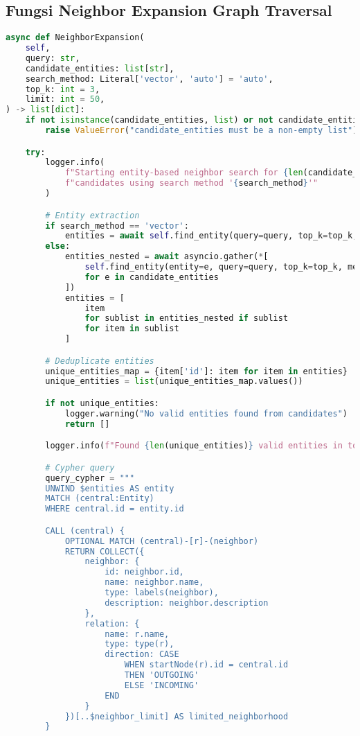 \subsection{Fungsi Neighbor Expansion Graph Traversal}
\begin{lstlisting}[numbers=none, language=python]
async def NeighborExpansion(
    self,
    query: str,
    candidate_entities: list[str],
    search_method: Literal['vector', 'auto'] = 'auto',
    top_k: int = 3,
    limit: int = 50,
) -> list[dict]:
    if not isinstance(candidate_entities, list) or not candidate_entities:
        raise ValueError("candidate_entities must be a non-empty list")

    try:
        logger.info(
            f"Starting entity-based neighbor search for {len(candidate_entities)} "
            f"candidates using search method '{search_method}'"
        )

        # Entity extraction
        if search_method == 'vector':
            entities = await self.find_entity(query=query, top_k=top_k, method='vector')
        else:
            entities_nested = await asyncio.gather(*[
                self.find_entity(entity=e, query=query, top_k=top_k, method='auto')
                for e in candidate_entities
            ])
            entities = [
                item
                for sublist in entities_nested if sublist
                for item in sublist
            ]

        # Deduplicate entities
        unique_entities_map = {item['id']: item for item in entities}
        unique_entities = list(unique_entities_map.values())

        if not unique_entities:
            logger.warning("No valid entities found from candidates")
            return []

        logger.info(f"Found {len(unique_entities)} valid entities in total from candidates")

        # Cypher query
        query_cypher = """
        UNWIND $entities AS entity
        MATCH (central:Entity) 
        WHERE central.id = entity.id

        CALL (central) {
            OPTIONAL MATCH (central)-[r]-(neighbor)
            RETURN COLLECT({
                neighbor: {
                    id: neighbor.id,
                    name: neighbor.name,
                    type: labels(neighbor),
                    description: neighbor.description
                },
                relation: {
                    name: r.name,
                    type: type(r),
                    direction: CASE 
                        WHEN startNode(r).id = central.id 
                        THEN 'OUTGOING' 
                        ELSE 'INCOMING' 
                    END
                }
            })[..$neighbor_limit] AS limited_neighborhood
        }


\end{lstlisting}
